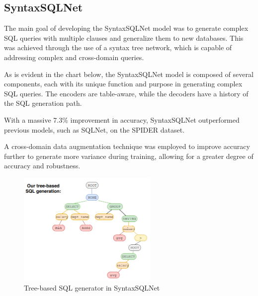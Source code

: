 \subsection{SyntaxSQLNet }%

The main\cite{DBLP:journals/corr/abs-1810-05237} goal of developing the SyntaxSQLNet model was to generate complex SQL queries with multiple clauses and generalize them to new databases.
This was achieved through the use of a syntax tree network, which is capable of addressing complex and cross-domain queries.

As is evident in the chart below, the SyntaxSQLNet model is composed of several components, each with its unique function and purpose in generating complex SQL queries. The encoders are table-aware, while the decoders have a history of the SQL generation path.

With a massive 7.3\% improvement in accuracy, SyntaxSQLNet outperformed previous models, such as SQLNet, on the SPIDER dataset.

A cross-domain data augmentation technique was employed to improve accuracy further to generate more variance during training, allowing for a greater degree of accuracy and robustness.

\begin{figure}[htb]
    \centering
    \includegraphics[width=0.6\textwidth]{pics/SyntaxSQLNet/Tree-based.png}
    \caption{Tree-based SQL generator in SyntaxSQLNet}
    \label{fig:tree-based}
\end{figure}

